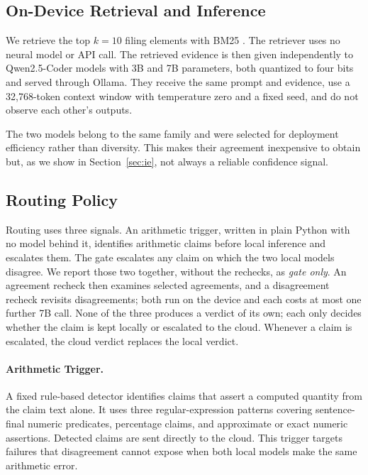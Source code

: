 \documentclass{article}
\begin{document}
\subsection{On-Device Retrieval and Inference}
\label{sec:local}
We retrieve the top $k{=}10$ filing elements with BM25 \citep{robertson2009bm25}. The retriever uses no neural model or API call. The retrieved evidence is then given independently to Qwen2.5-Coder models with 3B and 7B parameters, both quantized to four bits and served through Ollama. They receive the same prompt and evidence, use a 32,768-token context window with temperature zero and a fixed seed, and do not observe each other's outputs.

The two models belong to the same family and were selected for deployment efficiency rather than diversity. This makes their agreement inexpensive to obtain but, as we show in Section~\ref{sec:ie}, not always a reliable confidence signal.

\subsection{Routing Policy}
\label{sec:routing}
Routing uses three signals. An arithmetic trigger, written in plain Python with no model behind it, identifies arithmetic claims before local inference and escalates them. The gate escalates any claim on which the two local models disagree. We report those two together, without the rechecks, as \emph{gate only}. An agreement recheck then examines selected agreements, and a disagreement recheck revisits disagreements; both run on the device and each costs at most one further 7B call. None of the three produces a verdict of its own; each only decides whether the claim is kept locally or escalated to the cloud. Whenever a claim is escalated, the cloud verdict replaces the local verdict.

\paragraph{Arithmetic Trigger.}
A fixed rule-based detector identifies claims that assert a computed quantity from the claim text alone. It uses three regular-expression patterns covering sentence-final numeric predicates, percentage claims, and approximate or exact numeric assertions. Detected claims are sent directly to the cloud. This trigger targets failures that disagreement cannot expose when both local models make the same arithmetic error.
\end{document}
